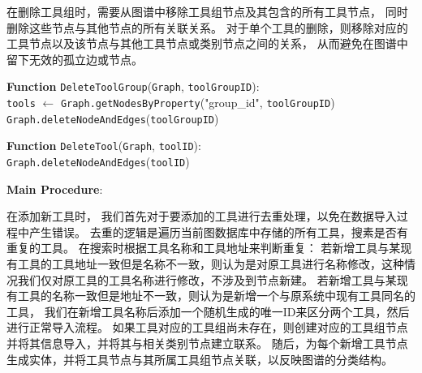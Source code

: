 在删除工具组时，需要从图谱中移除工具组节点及其包含的所有工具节点，
同时删除这些节点与其他节点的所有关联关系。
对于单个工具的删除，则移除对应的工具节点以及该节点与其他工具节点或类别节点之间的关系，
从而避免在图谱中留下无效的孤立边或节点。

\begin{algorithm}[!hpt]

    \label{alg:delete_tool_graph}
    

    \BlankLine
    \textbf{Function} \texttt{DeleteToolGroup}(\texttt{Graph}, \texttt{toolGroupID}):\\
    \Indp
        \texttt{tools} $\gets$ \texttt{Graph.getNodesByProperty}("group\_id", \texttt{toolGroupID})\;
        \texttt{Graph.deleteNodeAndEdges}(\texttt{toolGroupID})\;
    \Indm
    \BlankLine
    
    \textbf{Function} \texttt{DeleteTool}(\texttt{Graph}, \texttt{toolID}):\\
    \Indp
        \texttt{Graph.deleteNodeAndEdges}(\texttt{toolID})\;
    \Indm
    \BlankLine
    
    \textbf{Main Procedure}:\\
    \Indp
    \Indm
    \end{algorithm}

在添加新工具时，
我们首先对于要添加的工具进行去重处理，以免在数据导入过程中产生错误。
去重的逻辑是遍历当前图数据库中存储的所有工具，搜素是否有重复的工具。
在搜索时根据工具名称和工具地址来判断重复：
若新增工具与某现有工具的工具地址一致但是名称不一致，则认为是对原工具进行名称修改，这种情况我们仅对原工具的工具名称进行修改，不涉及到节点新建。
若新增工具与某现有工具的名称一致但是地址不一致，则认为是新增一个与原系统中现有工具同名的工具，
我们在新增工具名称后添加一个随机生成的唯一ID来区分两个工具，然后进行正常导入流程。
如果工具对应的工具组尚未存在，则创建对应的工具组节点并将其信息导入，并将其与相关类别节点建立联系。
随后，为每个新增工具节点生成实体，并将工具节点与其所属工具组节点关联，以反映图谱的分类结构。

